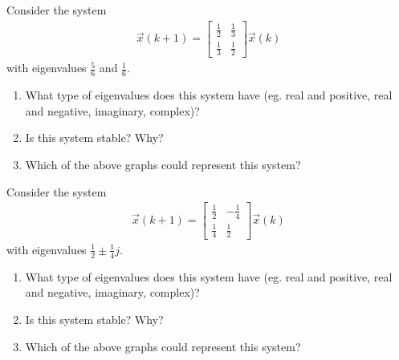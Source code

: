 \begin{enumerate}
    \qitem Consider the system
    \begin{align*}
        \vec{x}(k + 1) = \begin{bmatrix}
            \frac{1}{2} & \frac{1}{3} \\
            \frac{1}{3} & \frac{1}{2}
        \end{bmatrix} \vec{x}(k)
    \end{align*}
    with eigenvalues $\frac{5}{6}$ and $\frac{1}{6}$.
    \begin{enumerate}
        \item What type of eigenvalues does this system have (eg. real and positive, real and negative, imaginary, complex)?
        \item Is this system stable? Why?
        \item Which of the above graphs could represent this system?
    \end{enumerate}

    \qitem Consider the system
    \begin{align*}
        \vec{x}(k + 1) = \begin{bmatrix}
            \frac{1}{2} & -\frac{1}{4} \\
            \frac{1}{4} & \frac{1}{2}
        \end{bmatrix} \vec{x}(k)
    \end{align*}
    with eigenvalues $\frac{1}{2} \pm \frac{1}{4}j$.
    \begin{enumerate}
        \item What type of eigenvalues does this system have (eg. real and positive, real and negative, imaginary, complex)?
        \item Is this system stable? Why?
        \item Which of the above graphs could represent this system?
    \end{enumerate}


\end{enumerate}
